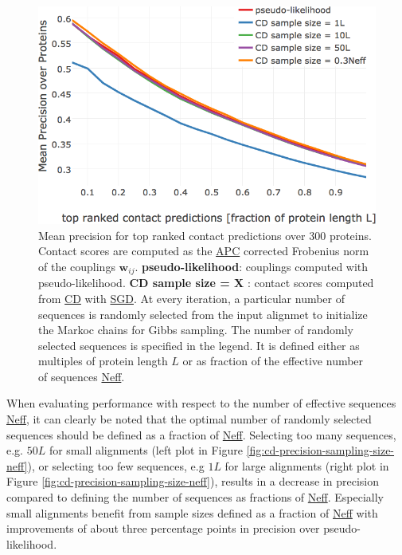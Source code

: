 \documentclass[11pt,a4paper,twoside]{book}
\newcommand{\wij}{\mathbf{w}_{ij}}
\theoremstyle{definition}
\theoremstyle{definition}
\theoremstyle{remark}
\begin{document}
\begin{figure}

{\centering \includegraphics[width=0.9\linewidth]{img/full_likelihood/gibbs_sampling/precision_vs_rank_samplesize} 

}

\caption{Mean precision for top ranked
contact predictions over 300 proteins. Contact scores are computed as
the \protect\hyperlink{abbrev}{APC} corrected Frobenius norm of the
couplings \(\wij\). \textbf{pseudo-likelihood}: couplings computed with
pseudo-likelihood. \textbf{CD sample size = X }: contact scores computed
from \protect\hyperlink{abbrev}{CD} with
\protect\hyperlink{abbrev}{SGD}. At every iteration, a particular number
of sequences is randomly selected from the input alignmet to initialize
the Markoc chains for Gibbs sampling. The number of randomly selected
sequences is specified in the legend. It is defined either as multiples
of protein length \(L\) or as fraction of the effective number of
sequences \protect\hyperlink{abbrev}{Neff}.}\label{fig:cd-performance-samplesize}
\end{figure}

When evaluating performance with respect to the number of effective
sequences \protect\hyperlink{abbrev}{Neff}, it can clearly be noted that
the optimal number of randomly selected sequences should be defined as a
fraction of \protect\hyperlink{abbrev}{Neff}. Selecting too many
sequences, e.g. \(50L\) for small alignments (left plot in Figure
\ref{fig:cd-precision-sampling-size-neff}), or selecting too few
sequences, e.g \(1L\) for large alignments (right plot in Figure
\ref{fig:cd-precision-sampling-size-neff}), results in a decrease in
precision compared to defining the number of sequences as fractions of
\protect\hyperlink{abbrev}{Neff}. Especially small alignments benefit
from sample sizes defined as a fraction of
\protect\hyperlink{abbrev}{Neff} with improvements of about three
percentage points in precision over pseudo-likelihood.
\end{document}
